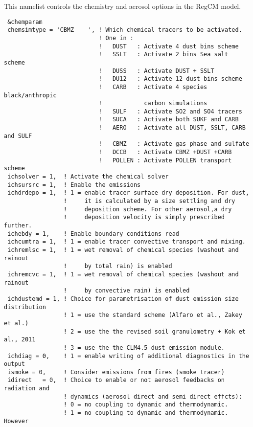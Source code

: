 This namelist controls the chemistry and aerosol options in the RegCM model.

{\footnotesize
\begin{Verbatim}
 &chemparam
 chemsimtype = 'CBMZ    ', ! Which chemical tracers to be activated.
                           ! One in :
                           !   DUST   : Activate 4 dust bins scheme
                           !   SSLT   : Activate 2 bins Sea salt scheme
                           !   DUSS   : Activate DUST + SSLT
                           !   DU12   : Activate 12 dust bins scheme
                           !   CARB   : Activate 4 species black/anthropic
                           !            carbon simulations
                           !   SULF   : Activate SO2 and SO4 tracers
                           !   SUCA   : Activate both SUKF and CARB
                           !   AERO   : Activate all DUST, SSLT, CARB and SULF
                           !   CBMZ   : Activate gas phase and sulfate
                           !   DCCB   : Activate CBMZ +DUST +CARB
                           !   POLLEN : Activate POLLEN transport scheme
 ichsolver = 1,  ! Activate the chemical solver
 ichsursrc = 1,  ! Enable the emissions
 ichdrdepo = 1,  ! 1 = enable tracer surface dry deposition. For dust,
                 !     it is calculated by a size settling and dry
                 !     deposition scheme. For other aerosol,a dry
                 !     deposition velocity is simply prescribed further.
 ichebdy = 1,    ! Enable boundary conditions read
 ichcumtra = 1,  ! 1 = enable tracer convective transport and mixing.
 ichremlsc = 1,  ! 1 = wet removal of chemical species (washout and rainout
                 !     by total rain) is enabled
 ichremcvc = 1,  ! 1 = wet removal of chemical species (washout and rainout
                 !     by convective rain) is enabled
 ichdustemd = 1, ! Choice for parametrisation of dust emission size distribution
                 ! 1 = use the standard scheme (Alfaro et al., Zakey et al.)
                 ! 2 = use the the revised soil granulometry + Kok et al., 2011
                 ! 3 = use the the CLM4.5 dust emission module.
 ichdiag = 0,    ! 1 = enable writing of additional diagnostics in the output
 ismoke = 0,     ! Consider emissions from fires (smoke tracer)
 idirect   = 0,  ! Choice to enable or not aerosol feedbacks on radiation and
                 ! dynamics (aerosol direct and semi direct effcts):
                 ! 0 = no coupling to dynamic and thermodynamic.
                 ! 1 = no coupling to dynamic and thermodynamic. However

\end{Verbatim}}
